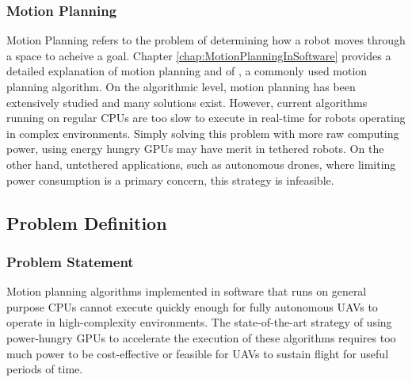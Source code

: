         

    \subsubsection*{Motion Planning}
        
        Motion Planning refers to the problem of determining how a robot moves through a space to acheive a goal. Chapter \ref{chap:MotionPlanningInSoftware} provides a detailed explanation of motion planning and of , a commonly used motion planning algorithm.
        \newline
        On the algorithmic level, motion planning has been extensively studied and many solutions exist. However, current algorithms running on regular \gls{CPU}s are too slow to execute in \gls{real-time} for robots operating in complex environments. Simply solving this problem with more raw computing power, using energy hungry \gls{GPU}s may have merit in \gls{tethered robot}s. On the other hand, untethered applications, such as autonomous drones, where limiting power consumption is a primary concern, this strategy is infeasible.
        

\newpage
\subsection{Problem Definition}

    \subsubsection*{Problem Statement}
    Motion planning algorithms implemented in software that runs on general purpose \gls{CPU}s cannot execute quickly enough for fully autonomous \gls{UAV}s to operate in high-complexity environments. The state-of-the-art strategy of using power-hungry \gls{GPU}s to accelerate the execution of these algorithms requires too much power to be cost-effective or feasible for \gls{UAV}s to sustain flight for useful periods of time. 

